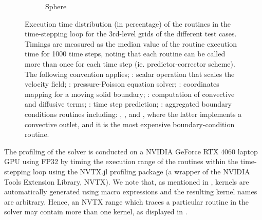 \documentclass[10pt,a4paper]{article}
\begin{document}
\begin{figure}[!t]
\begin{subfigure}[t]{0.32\linewidth}
    \caption{Sphere\hspace*{2em}}
  \end{subfigure}
  \begin{subfigure}[t]{0.325\linewidth}
    \centering
  \end{subfigure}
  \caption{Execution time distribution (in percentage) of the routines in the time-stepping loop for the 3rd-level grids of the different test cases. Timings are measured as the median value of the routine execution time for 1000 time steps, noting that each routine can be called more than once for each time step (ie. predictor-corrector scheme). The following convention applies; : scalar operation that scales the velocity field; : pressure-Poisson equation solver; : coordinates mapping for a moving solid boundary; : computation of convective and diffusive terms; : time step prediction; : aggregated boundary conditions routines including: , , and , where the latter implements a convective outlet, and it is the most expensive boundary-condition routine.}
\label{fig:profiling}
\end{figure}

The profiling of the solver is conducted on a NVIDIA GeForce RTX 4060 laptop GPU using FP32 by timing the execution range of the routines within the time-stepping loop using the NVTX.jl profiling package \citep{Byrne2023} (a wrapper of the NVIDIA Tools Extension Library, NVTX). We note that, as mentioned in , kernels are automatically generated using macro expressions and the resulting kernel names are arbitrary. Hence, an NVTX range which traces a particular routine in the solver may contain more than one kernel, as displayed in .
\end{document}
